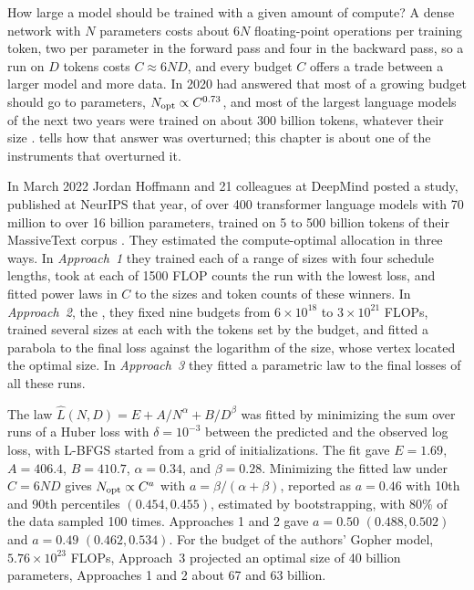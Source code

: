 \begin{refsection}
How large a model should be trained with a given amount of compute? A dense network with $N$ parameters costs about $6N$ floating-point operations per training token, two per parameter in the forward pass and four in the backward pass, so a run on $D$ tokens costs $C\approx6ND$, and every budget $C$ offers a trade between a larger model and more data. In 2020 \textcite{KaplanEtAl2020} had answered that most of a growing budget should go to parameters, $N_{\mathrm{opt}}\propto C^{0.73}$, and most of the largest language models of the next two years were trained on about 300 billion tokens, whatever their size \parencite[Table~1]{HoffmannEtAl2022}.  tells how that answer was overturned; this chapter is about one of the instruments that overturned it.

In March 2022 Jordan Hoffmann and 21 colleagues at DeepMind posted a study, published at NeurIPS that year, of over 400 transformer language models with 70 million to over 16 billion parameters, trained on 5 to 500 billion tokens of their MassiveText corpus \parencite{HoffmannEtAl2022}. They estimated the compute-optimal allocation in three ways. In \emph{Approach~1} they trained each of a range of sizes with four schedule lengths, took at each of 1500 FLOP counts the run with the lowest loss, and fitted power laws in $C$ to the sizes and token counts of these winners. In \emph{Approach~2}, the , they fixed nine budgets from $6\times10^{18}$ to $3\times10^{21}$ FLOPs, trained several sizes at each with the tokens set by the budget, and fitted a parabola to the final loss against the logarithm of the size, whose vertex located the optimal size. In \emph{Approach~3} they fitted a parametric law to the final losses of all these runs.

\begin{finding}\label{fd:fitting:approach3}
The law $\hat L(N,D)=E+A/N^{\alpha}+B/D^{\beta}$ was fitted by minimizing the sum over runs of a Huber loss with $\delta=10^{-3}$ between the predicted and the observed log loss, with L-BFGS started from a grid of initializations. The fit gave $E=1.69$, $A=406.4$, $B=410.7$, $\alpha=0.34$, and $\beta=0.28$. Minimizing the fitted law under $C=6ND$ gives $N_{\mathrm{opt}}\propto C^{a}$ with $a=\beta/(\alpha+\beta)$, reported as $a=0.46$ with 10th and 90th percentiles $(0.454,0.455)$, estimated by bootstrapping, with 80\% of the data sampled 100 times. Approaches 1 and 2 gave $a=0.50$ $(0.488,0.502)$ and $a=0.49$ $(0.462,0.534)$. For the budget of the authors' Gopher model, $5.76\times10^{23}$ FLOPs, Approach~3 projected an optimal size of 40 billion parameters, Approaches 1 and 2 about 67 and 63 billion.
\end{finding}


\end{refsection}
